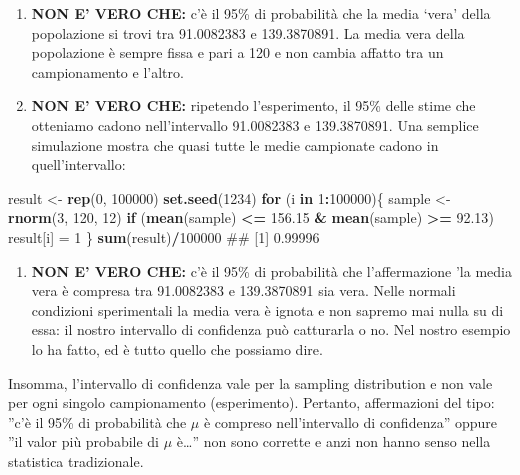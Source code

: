 \documentclass[a4paper,12pt,oneside]{book}
\providecommand{\tightlist}{%
  \setlength{\itemsep}{0pt}\setlength{\parskip}{0pt}}
\newenvironment{Shaded}{\begin{snugshade}}{\end{snugshade}}
\newcommand{\KeywordTok}[1]{\textcolor[rgb]{0.13,0.29,0.53}{\textbf{#1}}}
\newcommand{\DecValTok}[1]{\textcolor[rgb]{0.00,0.00,0.81}{#1}}
\newcommand{\FloatTok}[1]{\textcolor[rgb]{0.00,0.00,0.81}{#1}}
\newcommand{\StringTok}[1]{\textcolor[rgb]{0.31,0.60,0.02}{#1}}
\newcommand{\ControlFlowTok}[1]{\textcolor[rgb]{0.13,0.29,0.53}{\textbf{#1}}}
\newcommand{\OperatorTok}[1]{\textcolor[rgb]{0.81,0.36,0.00}{\textbf{#1}}}
\newcommand{\NormalTok}[1]{#1}
\theoremstyle{definition}
\theoremstyle{definition}
\theoremstyle{definition}
\theoremstyle{remark}
\begin{document}
\begin{enumerate}
\def\labelenumi{\arabic{enumi}.}
\tightlist
\item
  \textbf{NON E' VERO CHE:} c'è il 95\% di probabilità che la media
  `vera' della popolazione si trovi tra 91.0082383 e 139.3870891. La
  media vera della popolazione è sempre fissa e pari a 120 e non cambia
  affatto tra un campionamento e l'altro.
\item
  \textbf{NON E' VERO CHE:} ripetendo l'esperimento, il 95\% delle stime
  che otteniamo cadono nell'intervallo 91.0082383 e 139.3870891. Una
  semplice simulazione mostra che quasi tutte le medie campionate cadono
  in quell'intervallo:
\end{enumerate}

\begin{Shaded}
\begin{Highlighting}[]
\NormalTok{result <-}\StringTok{ }\KeywordTok{rep}\NormalTok{(}\DecValTok{0}\NormalTok{, }\DecValTok{100000}\NormalTok{)}
\KeywordTok{set.seed}\NormalTok{(}\DecValTok{1234}\NormalTok{)}
\ControlFlowTok{for}\NormalTok{ (i }\ControlFlowTok{in} \DecValTok{1}\OperatorTok{:}\DecValTok{100000}\NormalTok{)\{}
\NormalTok{  sample <-}\StringTok{ }\KeywordTok{rnorm}\NormalTok{(}\DecValTok{3}\NormalTok{, }\DecValTok{120}\NormalTok{, }\DecValTok{12}\NormalTok{)}
  \ControlFlowTok{if}\NormalTok{ (}\KeywordTok{mean}\NormalTok{(sample) }\OperatorTok{<=}\StringTok{ }\FloatTok{156.15} \OperatorTok{&}\StringTok{ }\KeywordTok{mean}\NormalTok{(sample) }\OperatorTok{>=}\StringTok{ }\FloatTok{92.13}\NormalTok{) result[i] =}\StringTok{ }\DecValTok{1}
\NormalTok{\}}
\KeywordTok{sum}\NormalTok{(result)}\OperatorTok{/}\DecValTok{100000}
\NormalTok{## [1] 0.99996}
\end{Highlighting}
\end{Shaded}

\begin{enumerate}
\def\labelenumi{\arabic{enumi}.}
\setcounter{enumi}{2}
\tightlist
\item
  \textbf{NON E' VERO CHE:} c'è il 95\% di probabilità che
  l'affermazione 'la media vera è compresa tra 91.0082383 e 139.3870891
  sia vera. Nelle normali condizioni sperimentali la media vera è ignota
  e non sapremo mai nulla su di essa: il nostro intervallo di confidenza
  può catturarla o no. Nel nostro esempio lo ha fatto, ed è tutto quello
  che possiamo dire.
\end{enumerate}

Insomma, l'intervallo di confidenza vale per la sampling distribution e
non vale per ogni singolo campionamento (esperimento). Pertanto,
affermazioni del tipo: ''c'è il 95\% di probabilità che \(\mu\) è
compreso nell'intervallo di confidenza'' oppure ''il valor più probabile
di \(\mu\) è\ldots{}'' non sono corrette e anzi non hanno senso nella
statistica tradizionale.
\end{document}
